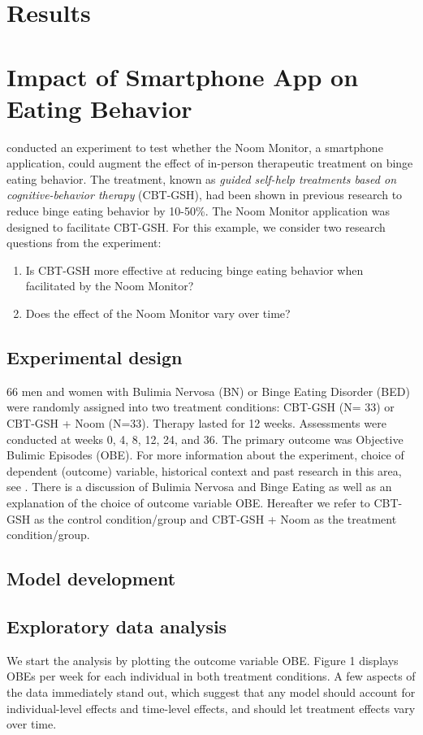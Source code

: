 \documentclass{article}
\begin{document}
\section{Results}
\section*{Impact of Smartphone App on Eating Behavior}
 conducted an experiment to test whether the Noom Monitor, a smartphone application, could augment the effect of in-person therapeutic treatment on binge eating behavior.  The treatment, known as \emph{guided self-help treatments based on cognitive-behavior therapy} (CBT-GSH), had been shown in previous research to reduce binge eating behavior by 10-50\%.  The Noom Monitor application was designed to facilitate CBT-GSH.  For this example, we consider two research questions from the experiment:
\begin{enumerate}
\item{Is CBT-GSH more effective at reducing binge eating behavior when facilitated by the Noom Monitor?}
\item{Does the effect of the Noom Monitor vary over time?}
\end{enumerate}

\subsection{Experimental design}

66 men and women with Bulimia Nervosa (BN) or Binge Eating Disorder (BED) were randomly assigned into two treatment conditions: CBT-GSH (N= 33) or CBT-GSH + Noom (N=33).  Therapy lasted for 12 weeks.  Assessments were conducted at weeks 0, 4, 8, 12, 24, and 36.  The primary outcome was Objective Bulimic Episodes (OBE).  For more information about the experiment, choice of dependent (outcome) variable, historical context and past research in this area, see . There is a discussion of Bulimia Nervosa and Binge Eating as well as an explanation of the choice of outcome variable OBE. Hereafter we refer to CBT-GSH as the control condition/group and CBT-GSH + Noom as the treatment condition/group.

\subsection{Model development}
\subsection*{Exploratory data analysis}
We start the analysis by plotting the outcome variable OBE. Figure 1 displays OBEs per week for each individual in both treatment conditions.  A few aspects of the data immediately stand out, which suggest that any model should account for individual-level effects and time-level effects, and should let treatment effects vary over time.  
\end{document}
